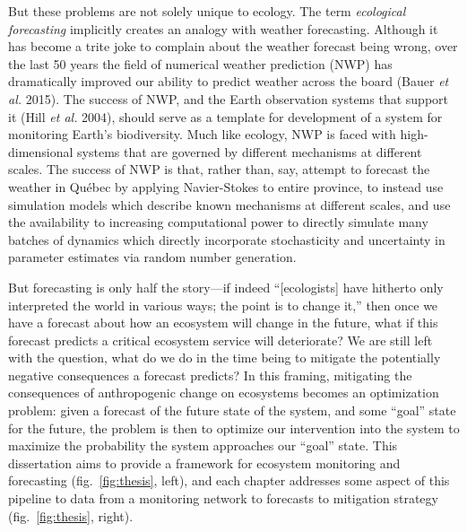 \documentclass[11pt]{article}
\begin{document}
But these problems are not solely unique to ecology. The term
\emph{ecological forecasting} implicitly creates an analogy with weather
forecasting. Although it has become a trite joke to complain about the
weather forecast being wrong, over the last 50 years the field of
numerical weather prediction (NWP) has dramatically improved our ability
to predict weather across the board (Bauer \emph{et al.} 2015). The
success of NWP, and the Earth observation systems that support it (Hill
\emph{et al.} 2004), should serve as a template for development of a
system for monitoring Earth's biodiversity. Much like ecology, NWP is
faced with high-dimensional systems that are governed by different
mechanisms at different scales. The success of NWP is that, rather than,
say, attempt to forecast the weather in Québec by applying Navier-Stokes
to entire province, to instead use simulation models which describe
known mechanisms at different scales, and use the availability to
increasing computational power to directly simulate many batches of
dynamics which directly incorporate stochasticity and uncertainty in
parameter estimates via random number generation.

But forecasting is only half the story---if indeed ``{[}ecologists{]}
have hitherto only interpreted the world in various ways; the point is
to change it,'' then once we have a forecast about how an ecosystem will
change in the future, what if this forecast predicts a critical
ecosystem service will deteriorate? We are still left with the question,
what do we do in the time being to mitigate the potentially negative
consequences a forecast predicts? In this framing, mitigating the
consequences of anthropogenic change on ecosystems becomes an
optimization problem: given a forecast of the future state of the
system, and some ``goal'' state for the future, the problem is then to
optimize our intervention into the system to maximize the probability
the system approaches our ``goal'' state. This dissertation aims to
provide a framework for ecosystem monitoring and forecasting
(fig.~\ref{fig:thesis}, left), and each chapter addresses some aspect of
this pipeline to data from a monitoring network to forecasts to
mitigation strategy (fig.~\ref{fig:thesis}, right).
\end{document}

